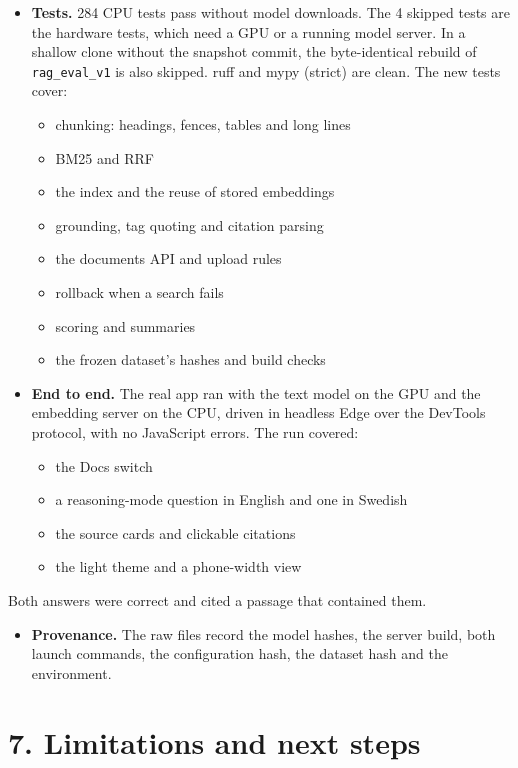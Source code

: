 \documentclass[11pt,a4paper]{article}
\newcommand{\code}[1]{\texttt{#1}}
\begin{document}
\begin{itemize}
\item \textbf{Tests.} 284 CPU tests pass without model downloads. The 4 skipped tests are the hardware tests, which need a GPU or a running model server. In a shallow clone without the snapshot commit, the byte-identical rebuild of \code{rag\_eval\_v1} is also skipped. ruff and mypy (strict) are clean. The new tests cover:
\begin{itemize}
\item chunking: headings, fences, tables and long lines
\item BM25 and RRF
\item the index and the reuse of stored embeddings
\item grounding, tag quoting and citation parsing
\item the documents API and upload rules
\item rollback when a search fails
\item scoring and summaries
\item the frozen dataset's hashes and build checks
\end{itemize}
\item \textbf{End to end.} The real app ran with the text model on the GPU and the embedding server on the CPU, driven in headless Edge over the DevTools protocol, with no JavaScript errors. The run covered:
\begin{itemize}
\item the Docs switch
\item a reasoning-mode question in English and one in Swedish
\item the source cards and clickable citations
\item the light theme and a phone-width view
\end{itemize}
\end{itemize}

Both answers were correct and cited a passage that contained them.
\begin{itemize}
\item \textbf{Provenance.} The raw files record the model hashes, the server build, both launch commands, the configuration hash, the dataset hash and the environment.
\end{itemize}

\section{7. Limitations and next steps}
\end{document}

